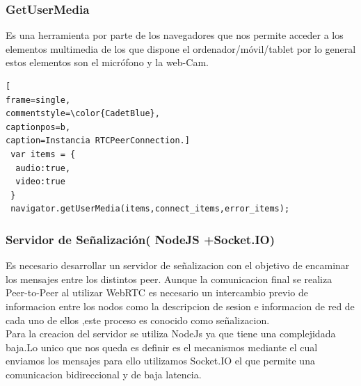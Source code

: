 \subsubsection{GetUserMedia}
Es una herramienta por parte de los navegadores que nos permite acceder a los elementos multimedia de los que dispone el ordenador/móvil/tablet  por lo general estos elementos son el micrófono y la web-Cam.
\begin{lstlisting}[
frame=single,
commentstyle=\color{CadetBlue},
captionpos=b,
caption=Instancia RTCPeerConnection.]
 var items = {
  audio:true,
  video:true
 }
 navigator.getUserMedia(items,connect_items,error_items);
\end{lstlisting}
\subsubsection{Servidor de Señalización( NodeJS +Socket.IO)}
 Es necesario desarrollar un servidor de señalizacion con el objetivo de encaminar los mensajes entre los distintos peer. Aunque la comunicacion final se realiza Peer-to-Peer al utilizar WebRTC es necesario un intercambio previo de informacion entre los nodos como la descripcion de sesion e informacion de red de cada uno de ellos ,este proceso es conocido como señalizacion.
\\Para la creacion del servidor se utiliza NodeJs ya que tiene una complejidada baja.Lo unico que nos queda es definir es el mecanismos mediante el cual enviamos los mensajes para ello utilizamos Socket.IO el que permite una comunicacion bidireccional  y de baja latencia.
